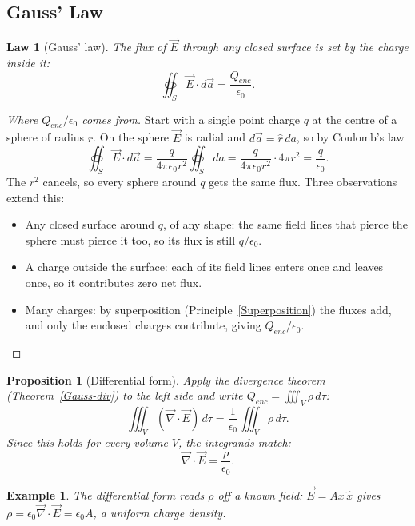 \documentclass{article}
\newtheorem{law}{Law}
\newtheorem*{example}{Example}
\newtheorem{proposition}{Proposition}
\begin{document}
\subsection{Gauss' Law}
\begin{law}[Gauss' law]
    The flux of $\vec{E}$ through any closed surface is set by the charge inside it:
    \begin{equation}
        \oiint_S \vec{E}\cdot d\vec{a} = \frac{Q_{enc}}{\epsilon_0}.
    \end{equation}
\end{law}
\begin{proof}[Where $Q_{enc}/\epsilon_0$ comes from]
    Start with a single point charge $q$ at the centre of a sphere of radius $r$. On the sphere $\vec{E}$ is radial and $d\vec{a} = \hat{r}\,da$, so by Coulomb's law
    \[\oiint_S\vec{E}\cdot d\vec{a} = \frac{q}{4\pi\epsilon_0 r^2}\oiint_S da = \frac{q}{4\pi\epsilon_0 r^2}\cdot 4\pi r^2 = \frac{q}{\epsilon_0}.\]
    The $r^2$ cancels, so every sphere around $q$ gets the same flux. Three observations extend this:
    \begin{itemize}
        \item Any closed surface around $q$, of any shape: the same field lines that pierce the sphere must pierce it too, so its flux is still $q/\epsilon_0$.
        \item A charge outside the surface: each of its field lines enters once and leaves once, so it contributes zero net flux.
        \item Many charges: by superposition (Principle~\ref{Superposition}) the fluxes add, and only the enclosed charges contribute, giving $Q_{enc}/\epsilon_0$.
    \end{itemize}
\end{proof}
\begin{proposition}[Differential form]
    Apply the divergence theorem (Theorem~\ref{Gauss-div}) to the left side and write $Q_{enc} = \iiint_V\rho\,d\tau$:
    \[\iiint_V(\vec{\nabla}\cdot\vec{E})\,d\tau = \frac{1}{\epsilon_0}\iiint_V \rho\,d\tau.\]
    Since this holds for every volume $V$, the integrands match:
    \begin{equation}
        \vec{\nabla}\cdot\vec{E} = \frac{\rho}{\epsilon_0}.
    \end{equation}
\end{proposition}
\begin{example}
    The differential form reads $\rho$ off a known field: $\vec{E} = Ax\,\hat{x}$ gives $\rho = \epsilon_0\vec{\nabla}\cdot\vec{E} = \epsilon_0 A$, a uniform charge density.
\end{example}
\end{document}
